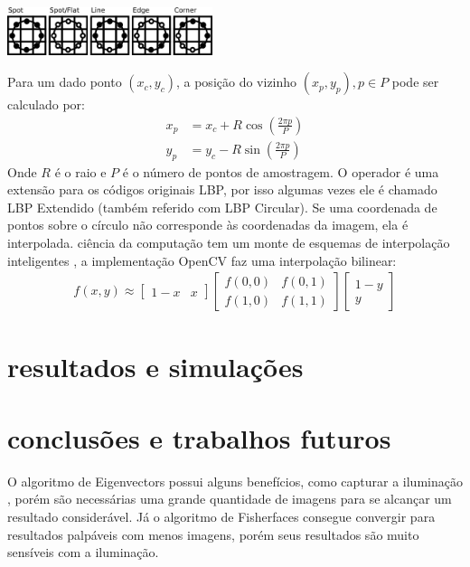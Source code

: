     \includegraphics[width=0.45\textwidth]{conteudo/patterns}

Para um dado ponto $(x_c, y_c)$, a posição do vizinho $(x_p,y_p), p \in P$ pode ser calculado por:
\begin{align*}
x_{p} & = x_c + R \cos({\frac{2\pi p}{P}})\\
y_{p} & = y_c - R \sin({\frac{2\pi p}{P}})
\end{align*}
Onde $R$ é o raio e $P$ é o número de pontos de amostragem.
O operador é uma extensão para os códigos originais LBP, por isso algumas vezes ele é chamado LBP Extendido (também referido com LBP Circular). Se uma coordenada de pontos sobre o círculo não corresponde às coordenadas da imagem, ela é interpolada. ciência da computação tem um monte de esquemas de interpolação inteligentes , a implementação OpenCV faz uma interpolação bilinear:
\begin{align*}
f(x,y) \approx \begin{bmatrix}
    1-x & x \end{bmatrix} \begin{bmatrix}
    f(0,0) & f(0,1) \\
    f(1,0) & f(1,1) \end{bmatrix} \begin{bmatrix}
    1-y \\
    y \end{bmatrix}
\end{align*}

\section*{resultados e simulações}


\section*{conclusões e trabalhos futuros}

O algoritmo de Eigenvectors possui alguns benefícios, como capturar a iluminação , porém  são necessárias uma grande quantidade de imagens para se alcançar um resultado considerável. Já o algoritmo de Fisherfaces consegue convergir para resultados palpáveis com menos imagens, porém seus resultados são muito sensíveis com a iluminação.

